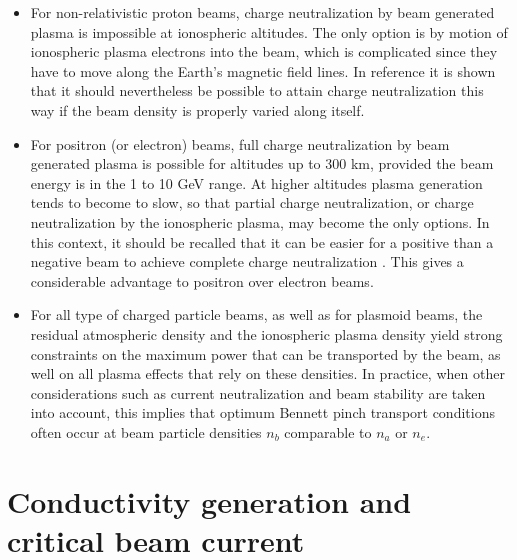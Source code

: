\documentclass [12pt,a4paper,     ]{report} %
\begin{document}
\begin {itemize}

\item  For non-relativistic proton beams, charge neutralization by beam generated plasma is impossible at ionospheric altitudes.  The only option is by motion of ionospheric plasma electrons into the beam, which is complicated since they have to move along the Earth's magnetic field lines.  In reference \cite{CHRIE1986-} it is shown that it should nevertheless be possible to attain charge neutralization this way if the beam density is properly varied along itself. 

\item  For positron (or electron) beams, full charge neutralization by beam generated plasma is possible for altitudes up to 300 km, provided the beam energy is in the 1 to 10 GeV range.  At higher altitudes plasma generation tends to become to slow, so that partial charge neutralization, or charge neutralization by the ionospheric plasma, may become the only options.  In this context, it should be recalled that it can be easier for a positive than a negative beam to achieve complete charge neutralization \cite{LOTOV1996-,KAGAN2001-}.  This gives a considerable advantage to positron over electron beams.

\item For all type of charged particle beams, as well as for plasmoid beams, the residual atmospheric density and the ionospheric plasma density yield strong constraints on the maximum power that can be transported by the beam, as well on all plasma effects that rely on these densities.   In practice, when other considerations such as current neutralization and beam stability are taken into account, this implies that optimum Bennett pinch transport conditions often occur at beam particle densities $n_b$ comparable to $n_a$ or $n_e$.

\end{itemize}




\section{Conductivity generation and critical beam current}
\label{cri:0}
\end{document}
